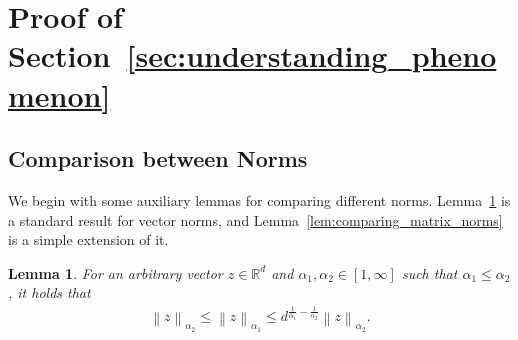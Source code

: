 \documentclass{article}
\newtheorem{lemma}{Lemma}
\theoremstyle{remark}
\newcommand{\Norm}[1]{\left\|#1\right\|}
\newcommand{\RR}{\mathbb{R}}
\begin{document}
\section{Proof of Section~\ref{sec:understanding_phenomenon}}

\subsection{Comparison between Norms}
We begin with some auxiliary lemmas for comparing different norms. Lemma~\ref{lem:comparison_vector_norms} is a standard result for vector norms, and Lemma~\ref{lem:comparing_matrix_norms} is a simple extension of it.

\begin{lemma}\label{lem:comparison_vector_norms}
    For an arbitrary vector $z \in \RR^d$ and $\alpha_1,\alpha_2 \in [1,\infty]$ such that $\alpha_1 \le \alpha_2$, it holds that
    \begin{align*}
        \Norm{z}_{\alpha_2} \le \Norm{z}_{\alpha_1} \le d^{\frac{1}{\alpha_1} - \frac{1}{\alpha_2}}\Norm{z}_{\alpha_2} .
    \end{align*}
\end{lemma}
\end{document}
